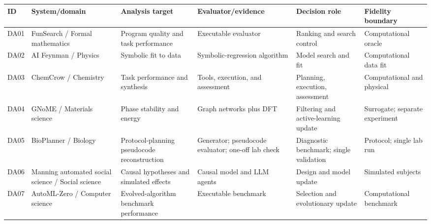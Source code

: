 \begin{tabular}{@{}p{.05\linewidth}p{.20\linewidth}p{.16\linewidth}p{.16\linewidth}p{.15\linewidth}p{.13\linewidth}@{}}
\toprule
ID & System/domain & Analysis target & Evaluator/evidence & Decision role & Fidelity boundary \\
\midrule
DA01 & FunSearch / Formal mathematics & Program quality and task performance & Executable evaluator & Ranking and search control & Computational oracle \\
DA02 & AI Feynman / Physics & Symbolic fit to data & Symbolic-regression algorithm & Model search and fit & Computational data fit \\
DA03 & ChemCrow / Chemistry & Task performance and synthesis & Tools, execution, and assessment & Planning, execution, assessment & Computational and physical \\
DA04 & GNoME / Materials science & Phase stability and energy & Graph networks plus DFT & Filtering and active-learning update & Surrogate; separate experiment \\
DA05 & BioPlanner / Biology & Protocol-planning pseudocode reconstruction & Generator; pseudocode evaluator; one-off lab check & Diagnostic benchmark; single validation & Protocol; single lab run \\
DA06 & Manning automated social science / Social science & Causal hypotheses and simulated effects & Causal model and LLM agents & Design and model update & Simulated subjects \\
DA07 & AutoML-Zero / Computer science & Evolved-algorithm benchmark performance & Executable benchmark & Selection and evolutionary update & Computational benchmark \\
\bottomrule
\end{tabular}
